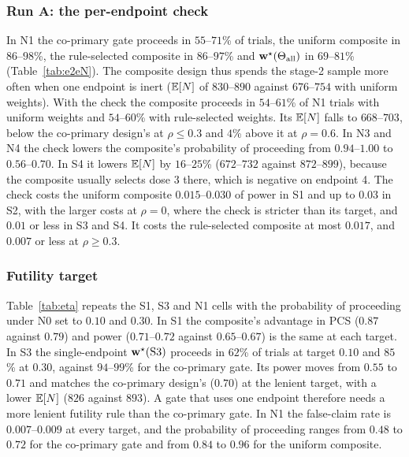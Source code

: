 \subsubsection{Run A: the per-endpoint check}
In N1 the co-primary gate proceeds in $55$--$71$\% of trials, the uniform composite in $86$--$98$\%, the rule-selected composite in $86$--$97$\% and $\mathbf{w}^\star(\Theta_{\mathrm{all}})$ in $69$--$81$\% (Table~\ref{tab:e2eN}). The composite design thus spends the stage-2 sample more often when one endpoint is inert ($\mathbb{E}[N]$ of $830$--$890$ against $676$--$754$ with uniform weights). With the check the composite proceeds in $54$--$61$\% of N1 trials with uniform weights and $54$--$60$\% with rule-selected weights. Its $\mathbb{E}[N]$ falls to $668$--$703$, below the co-primary design's at $\rho\le0.3$ and $4$\% above it at $\rho=0.6$. In N3 and N4 the check lowers the composite's probability of proceeding from $0.94$--$1.00$ to $0.56$--$0.70$. In S4 it lowers $\mathbb{E}[N]$ by $16$--$25$\% ($672$--$732$ against $872$--$899$), because the composite usually selects dose 3 there, which is negative on endpoint 4. The check costs the uniform composite $0.015$--$0.030$ of power in S1 and up to $0.03$ in S2, with the larger costs at $\rho=0$, where the check is stricter than its target, and $0.01$ or less in S3 and S4. It costs the rule-selected composite at most $0.017$, and $0.007$ or less at $\rho\ge0.3$.

\begin{table}
\centering\footnotesize
\caption{Sensitivity to the probability of proceeding under the global null to which $\eta$ is calibrated ($n_1=100$, $\rho=0.3$).}\label{tab:eta}

\end{table}

\subsubsection{Futility target}
Table~\ref{tab:eta} repeats the S1, S3 and N1 cells with the probability of proceeding under N0 set to $0.10$ and $0.30$. In S1 the composite's advantage in PCS ($0.87$ against $0.79$) and power ($0.71$--$0.72$ against $0.65$--$0.67$) is the same at each target. In S3 the single-endpoint $\mathbf{w}^\star(\mathrm{S3})$ proceeds in $62$\% of trials at target $0.10$ and $85$\% at $0.30$, against $94$--$99$\% for the co-primary gate. Its power moves from $0.55$ to $0.71$ and matches the co-primary design's ($0.70$) at the lenient target, with a lower $\mathbb{E}[N]$ ($826$ against $893$). A gate that uses one endpoint therefore needs a more lenient futility rule than the co-primary gate. In N1 the false-claim rate is $0.007$--$0.009$ at every target, and the probability of proceeding ranges from $0.48$ to $0.72$ for the co-primary gate and from $0.84$ to $0.96$ for the uniform composite.

